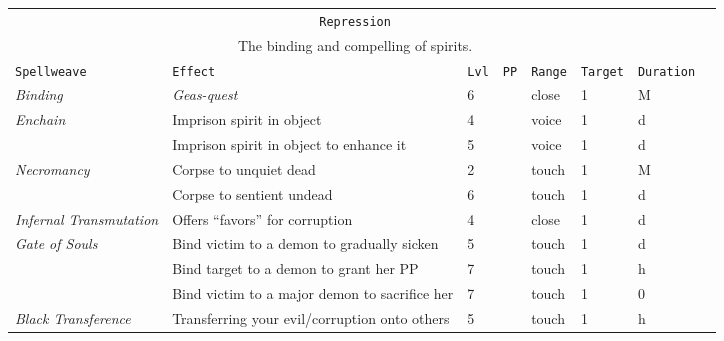 \documentclass[10pt,a4paper]{article}
\begin{document}
\begin{table}[htbp!]
\begin{tabular}{llllllll}
	
	\multicolumn{7}{c}{\texttt{Repression}}\\
	\multicolumn{7}{c}{The binding and compelling of spirits.}\\
    \hline
    \texttt{Spellweave} & \texttt{Effect} & \texttt{Lvl} & \texttt{PP} & \texttt{Range} & \texttt{Target} & \texttt{Duration} \\
    \hline
    \multirow{1}{*}{\textit{Binding}} & \textit{Geas-quest} & 6 && close & 1 & M \\
    \hline
    \multirow{1}{*}{\textit{Enchain}} & Imprison spirit in object & 4 && voice & 1 & d\\
								     & Imprison spirit in object to enhance it & 5 && voice & 1 & d\\
    \hline
    \multirow{1}{*}{\textit{Necromancy}} & Corpse to unquiet dead & 2 && touch & 1 & M\\
									    & Corpse to sentient undead & 6 && touch & 1 & d\\
    \hline
    \multirow{1}{*}{\textit{Infernal Transmutation}} & Offers ``favors'' for corruption & 4 && close & 1 & d\\ 
    \hline
    \multirow{1}{*}{\textit{Gate of Souls}} & Bind victim to a demon to gradually sicken & 5 && touch & 1 & d\\
										    & Bind target to a demon to grant her PP & 7 && touch & 1 & h\\
										    & Bind victim to a major demon to sacrifice her & 7 && touch & 1 & 0\\
    \hline
    \multirow{1}{*}{\textit{Black Transference}} & Transferring your evil/corruption onto others & 5 && touch & 1 & h \\
\end{tabular}
\end{table}  
\end{document}
